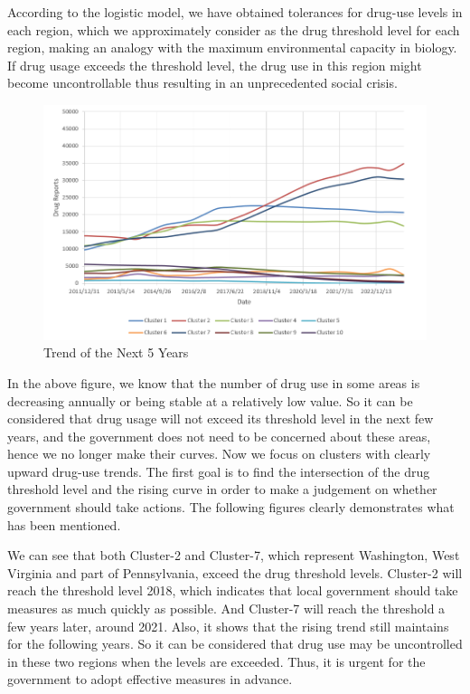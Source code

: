 \documentclass[12pt]{article}
\begin{document}
According to the logistic model, we have obtained tolerances for drug-use levels in each region, which we approximately consider as the drug threshold level for each region, making an analogy with the maximum environmental capacity in biology. If drug usage exceeds the threshold level, the drug use in this region might become uncontrollable thus resulting in an unprecedented social crisis.

\begin{figure}[H]
	\centering
	\includegraphics[scale=0.5]{./figures/5.png}
	\caption{Trend of the Next 5 Years}
	\label{Fig5}
\end{figure}

In the above figure, we know that the number of drug use in some areas is decreasing annually or being stable at a relatively low value. So it can be considered that drug usage will not exceed its threshold level in the next few years, and the government does not need to be concerned about these areas, hence we no longer make their curves. Now we focus on clusters with clearly upward drug-use trends. The first goal is to find the intersection of the drug threshold level and the rising curve in order to make a judgement on whether government should take actions. The following figures clearly demonstrates what has been mentioned.

We can see that both Cluster-2 and Cluster-7, which represent Washington, West Virginia and part of Pennsylvania, exceed the drug threshold levels. Cluster-2 will reach the threshold level 2018, which indicates that local government should take measures as much quickly as possible. And Cluster-7 will reach the threshold a few years later, around 2021. Also, it shows that the rising trend still maintains for the following years. So it can be considered that drug use may be uncontrolled in these two regions when the levels are exceeded. Thus, it is urgent for the government to adopt effective measures in advance.
\end{document}
